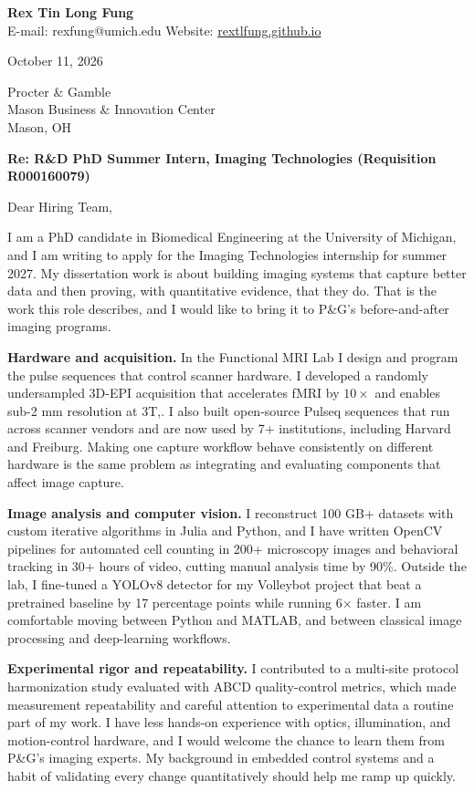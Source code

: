 \documentclass[11pt]{article}
\begin{document}
{\Large\textbf{Rex Tin Long Fung}}\\
E-mail: rexfung@umich.edu \quad Website: \href{https://rextlfung.github.io/}{rextlfung.github.io}

\medskip
October 11, 2026

\medskip
Procter \& Gamble\\
Mason Business \& Innovation Center\\
Mason, OH

\medskip
\textbf{Re: R\&D PhD Summer Intern, Imaging Technologies (Requisition R000160079)}

Dear Hiring Team,

I am a PhD candidate in Biomedical Engineering at the University of Michigan, and I am writing to apply for the Imaging Technologies internship for summer 2027. My dissertation work is about building imaging systems that capture better data and then proving, with quantitative evidence, that they do. That is the work this role describes, and I would like to bring it to P&G's before-and-after imaging programs.

\textbf{Hardware and acquisition.} In the Functional MRI Lab I design and program the pulse sequences that control scanner hardware. I developed a randomly undersampled 3D-EPI acquisition that accelerates fMRI by $10\times$ and enables sub-2 mm resolution at 3T,. I also built open-source Pulseq sequences that run across scanner vendors and are now used by 7+ institutions, including Harvard and Freiburg. Making one capture workflow behave consistently on different hardware is the same problem as integrating and evaluating components that affect image capture.

\textbf{Image analysis and computer vision.} I reconstruct 100 GB+ datasets with custom iterative algorithms in Julia and Python, and I have written OpenCV pipelines for automated cell counting in 200+ microscopy images and behavioral tracking in 30+ hours of video, cutting manual analysis time by 90\%. Outside the lab, I fine-tuned a YOLOv8 detector for my Volleybot project that beat a pretrained baseline by 17 percentage points while running 6$\times$ faster. I am comfortable moving between Python and MATLAB, and between classical image processing and deep-learning workflows.

\textbf{Experimental rigor and repeatability.} I contributed to a multi-site protocol harmonization study evaluated with ABCD quality-control metrics, which made measurement repeatability and careful attention to experimental data a routine part of my work. I have less hands-on experience with optics, illumination, and motion-control hardware, and I would welcome the chance to learn them from P\&G's imaging experts. My background in embedded control systems and a habit of validating every change quantitatively should help me ramp up quickly.
\end{document}
